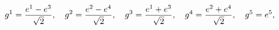 \begin{equation}
g^1 = {{e^1 - e^3}\over\sqrt2}, \quad g^2 = {{e^2 - e^4}\over\sqrt2},\quad
g^3 = {{e^1 + e^3}\over\sqrt2}, \quad g^4 = {{e^2 + e^4}\over\sqrt2},\quad
g^5 = e^5,
\label{fbasis}
\end{equation}

